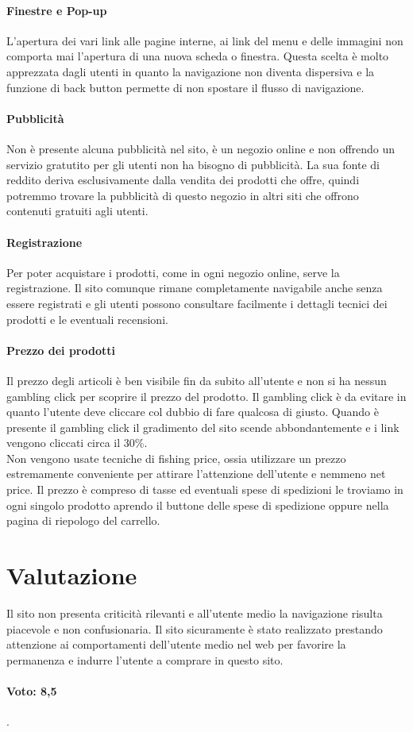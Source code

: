 \documentclass[12pt]{article}
\begin{document}
	\paragraph{Finestre e Pop-up} L'apertura dei vari link alle pagine interne, ai link del menu e delle immagini non comporta mai l'apertura di una nuova scheda o finestra. Questa scelta è molto apprezzata dagli utenti in quanto la navigazione non diventa dispersiva e la funzione di back button permette di non spostare il flusso di navigazione.
	\\
	\newpage
	\paragraph{Pubblicità} Non è presente alcuna pubblicità nel sito, è un negozio online e non offrendo un servizio gratutito per gli utenti non ha bisogno di pubblicità. La sua fonte di reddito deriva esclusivamente dalla vendita dei prodotti che offre, quindi potremmo trovare la pubblicità di questo negozio in altri siti che offrono contenuti gratuiti agli utenti. 
	\\
	\paragraph{Registrazione} Per poter acquistare i prodotti, come in ogni negozio online, serve la registrazione. Il sito comunque rimane completamente navigabile anche senza essere registrati e gli utenti possono consultare facilmente i dettagli tecnici dei prodotti e le eventuali recensioni.
	\\
	\paragraph{Prezzo dei prodotti} Il prezzo degli articoli è ben visibile fin da subito all'utente e non si ha nessun gambling click per scoprire il prezzo del prodotto. Il gambling click è da evitare in quanto l'utente deve cliccare col dubbio di fare qualcosa di giusto. Quando è presente il gambling click il gradimento del sito scende abbondantemente e i link vengono cliccati circa il 30\%.
	\\ 	Non vengono usate tecniche di fishing price, ossia utilizzare un prezzo estremamente conveniente per attirare l'attenzione dell'utente e nemmeno net price. Il prezzo è compreso di tasse ed eventuali spese di spedizioni le troviamo in ogni singolo prodotto aprendo il buttone delle spese di spedizione oppure nella pagina di riepologo del carrello.
	\newpage
	\section{Valutazione}
	\vspace{0.5cm}
	Il sito non presenta criticità rilevanti e all'utente medio la navigazione risulta piacevole e non confusionaria. Il sito sicuramente è stato realizzato prestando attenzione ai comportamenti dell'utente medio nel web per favorire la permanenza e indurre l'utente a comprare in questo sito. 
	\\
	\paragraph{Voto:  8,5}.
	
\end{document}
